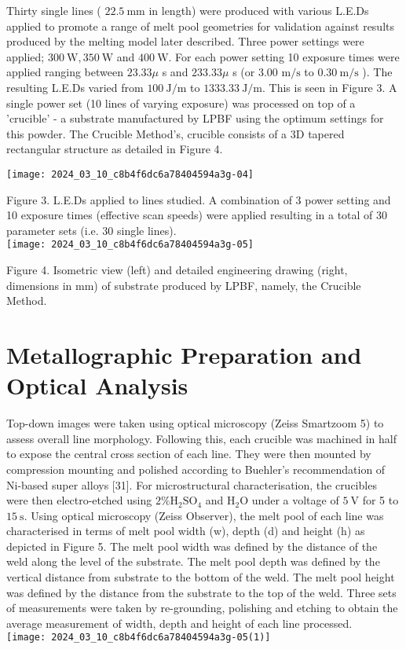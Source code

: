 \documentclass[10pt]{article}
\begin{document}
Thirty single lines ( $22.5 \mathrm{~mm}$ in length) were produced with various L.E.Ds applied to promote a range of melt pool geometries for validation against results produced by the melting model later described. Three power settings were applied; $300 \mathrm{~W}, 350 \mathrm{~W}$ and $400 \mathrm{~W}$. For each power setting 10 exposure times were applied ranging between $23.33 \mu$ s and $233.33 \mu$ s (or 3.00 $\mathrm{m} / \mathrm{s}$ to $0.30 \mathrm{~m} / \mathrm{s}$ ). The resulting L.E.Ds varied from $100 \mathrm{~J} / \mathrm{m}$ to $1333.33 \mathrm{~J} / \mathrm{m}$. This is seen in Figure 3. A single power set (10 lines of varying exposure) was processed on top of a 'crucible' - a substrate manufactured by LPBF using the optimum settings for this powder. The Crucible Method's, crucible consists of a 3D tapered rectangular structure as detailed in Figure 4.

\begin{center}
\texttt{[image: 2024\_03\_10\_c8b4f6dc6a78404594a3g-04]}
\end{center}

Figure 3. L.E.Ds applied to lines studied. A combination of 3 power setting and 10 exposure times (effective scan speeds) were applied resulting in a total of 30 parameter sets (i.e. 30 single lines).\\
\texttt{[image: 2024\_03\_10\_c8b4f6dc6a78404594a3g-05]}

Figure 4. Isometric view (left) and detailed engineering drawing (right, dimensions in mm) of substrate produced by LPBF, namely, the Crucible Method.

\section*{Metallographic Preparation and Optical Analysis}
Top-down images were taken using optical microscopy (Zeiss Smartzoom 5) to assess overall line morphology. Following this, each crucible was machined in half to expose the central cross section of each line. They were then mounted by compression mounting and polished according to Buehler's recommendation of Ni-based super alloys [31]. For microstructural characterisation, the crucibles were then electro-etched using $2 \% \mathrm{H}_{2} \mathrm{SO}_{4}$ and $\mathrm{H}_{2} \mathrm{O}$ under a voltage of $5 \mathrm{~V}$ for 5 to $15 \mathrm{~s}$. Using optical microscopy (Zeiss Observer), the melt pool of each line was characterised in terms of melt pool width (w), depth (d) and height (h) as depicted in Figure 5. The melt pool width was defined by the distance of the weld along the level of the substrate. The melt pool depth was defined by the vertical distance from substrate to the bottom of the weld. The melt pool height was defined by the distance from the substrate to the top of the weld. Three sets of measurements were taken by re-grounding, polishing and etching to obtain the average measurement of width, depth and height of each line processed.\\
\texttt{[image: 2024\_03\_10\_c8b4f6dc6a78404594a3g-05(1)]}
\end{document}
